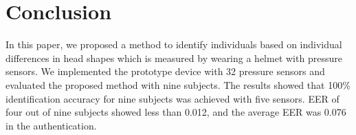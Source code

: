 \documentclass[sigchi,authordraft]{acmart}
\begin{document}
\section{Conclusion}
\label{sec:conclusion}
In this paper, we proposed a method to identify individuals based on individual differences in head shapes which is measured by wearing a helmet with pressure sensors. We implemented the prototype device with 32 pressure sensors and evaluated the proposed method with nine subjects. 
The results showed that 100\% identification accuracy for nine subjects was achieved with five sensors. EER of four out of nine subjects showed less than 0.012, and the average EER was 0.076 in the authentication.


\end{document}
